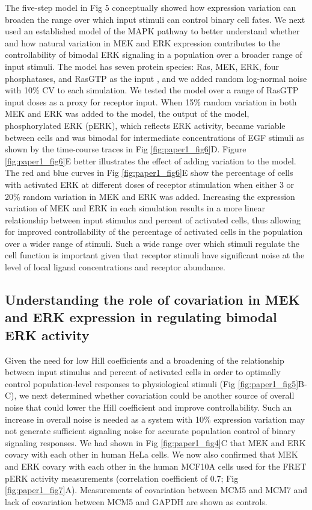 The five‐step model in Fig 5 conceptually showed how expression variation can broaden the range over which input stimuli can control binary cell fates. We next used an established model of the MAPK pathway to better understand whether and how natural variation in MEK and ERK expression contributes to the controllability of bimodal ERK signaling in a population over a broader range of input stimuli. The model has seven protein species: Ras, MEK, ERK, four phosphatases, and RasGTP as the input \cite{Sturm2010}, and we added random log-normal noise with 10\% CV to each simulation. We tested the model over a range of RasGTP input doses as a proxy for receptor input. When 15\% random variation in both MEK and ERK was added to the model, the output of the model, phosphorylated ERK (pERK), which reflects ERK activity, became variable between cells and was bimodal for intermediate concentrations of EGF stimuli as shown by the time-course traces in Fig \ref{fig:paper1_fig6}D. Figure \ref{fig:paper1_fig6}E better illustrates the effect of adding variation to the model. The red and blue curves in Fig \ref{fig:paper1_fig6}E show the percentage of cells with activated ERK at different doses of receptor stimulation when either 3 or 20\% random variation in MEK and ERK was added. Increasing the expression variation of MEK and ERK in each simulation results in a more linear relationship between input stimulus and percent of activated cells, thus allowing for improved controllability of the percentage of activated cells in the population over a wider range of stimuli. Such a wide range over which stimuli regulate the cell function is important given that receptor stimuli have significant noise at the level of local ligand concentrations and receptor abundance.

\subsection{Understanding the role of covariation in MEK and ERK expression in regulating bimodal ERK activity}

Given the need for low Hill coefficients and a broadening of the relationship between input stimulus and percent of activated cells in order to optimally control population‐level responses to physiological stimuli (Fig \ref{fig:paper1_fig5}B-C), we next determined whether covariation could be another source of overall noise that could lower the Hill coefficient and improve controllability. Such an increase in overall noise is needed as a system with 10\% expression variation may not generate sufficient signaling noise for accurate population control of binary signaling responses. We had shown in Fig \ref{fig:paper1_fig4}C that MEK and ERK covary with each other in human HeLa cells. We now also confirmed that MEK and ERK covary with each other in the human MCF10A cells used for the FRET pERK activity measurements (correlation coefficient of 0.7; Fig \ref{fig:paper1_fig7}A). Measurements of covariation between MCM5 and MCM7 and lack of covariation between MCM5 and GAPDH are shown as controls.

